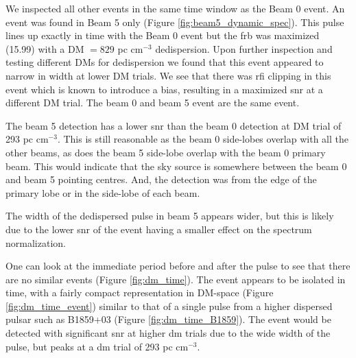 \documentclass[a4paper,fleqn,usenatbib]{mnras}
\begin{document}
We inspected all other events in the same time window as the Beam 0 event. An
event was found in Beam 5 only (Figure \ref{fig:beam5_dynamic_spec}). This pulse
lines up exactly in time with the Beam 0 event but the \gls{frb} was maximized
(15.99) with a DM $= 829$ pc cm$^{-3}$ dedispersion. Upon further inspection and
testing different DMs for dedispersion we found that this event appeared to
narrow in width at lower DM trials. We see that there was \gls{rfi} clipping in
this event which is known to introduce a bias, resulting in a maximized
\gls{snr} at a different DM trial. The beam 0 and beam 5 event are the same
event.

The beam 5 detection has a lower \gls{snr} than the beam 0 detection at DM trial
of 293 pc cm$^{-3}$. This is still reasonable as the beam 0 side-lobes overlap
with all the other beams, as does the beam 5 side-lobe overlap with the beam 0
primary beam. This would indicate that the sky source is somewhere between the
beam 0 and beam 5 pointing centres. And, the detection was from the edge of the
primary lobe or in the side-lobe of each beam.

The width of the dedispersed pulse in beam 5 appears wider, but this is likely
due to the lower \gls{snr} of the event having a smaller effect on the
spectrum normalization.

One can look at the immediate period before and after the pulse to see that
there are no similar events (Figure \ref{fig:dm_time}). The event appears to be
isolated in time, with a fairly compact representation in DM-space (Figure
\ref{fig:dm_time_event}) similar to that of a single pulse from a higher
dispersed pulsar such as B1859+03 (Figure \ref{fig:dm_time_B1859}). The event
would be detected with significant \gls{snr} at higher \gls{dm} trials due to
the wide width of the pulse, but peaks at a \gls{dm} trial of 293 pc cm$^{-3}$.
\end{document}
